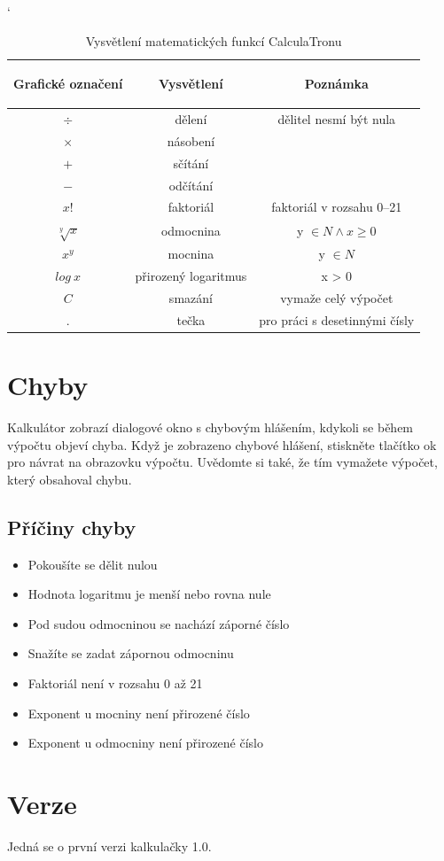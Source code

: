 \documentclass[11pt,a4paper]{article}
\begin{document}
\begin{table}[h]
\begin{center}

\catcode` %
\begin{tabular}{|c|c|c|} \hline
\label{tab1}
    
     \textbf{Grafické označení}  & \textbf{Vysvětlení} & \textbf{Poznámka}\\ \hline
    $ \div$ & dělení & dělitel nesmí být nula \\
    $\times$ & násobení & \\
    $+$ & sčítání & \\
    $-$ & odčítání & \\
    $x!$ & faktoriál & faktoriál v rozsahu 0--21\\
    $\sqrt[y]{x}$& odmocnina & y $\in N \wedge x \geq 0$\\
    $x^y$& mocnina & y $\in N $\\
    $log~x$& přirozený logaritmus & x > 0\\
    $C$& smazání & vymaže celý výpočet\\
    $.$ & tečka & pro práci s desetinnými čísly\\ \hline
   
\end{tabular}

\caption{ Vysvětlení matematických funkcí CalculaTronu}

\end{center}
\end{table}


\section{Chyby}
Kalkulátor zobrazí dialogové okno s chybovým hlášením, kdykoli se během výpočtu objeví chyba. Když je zobrazeno chybové hlášení, stiskněte tlačítko ok pro návrat na obrazovku výpočtu. Uvědomte si také, že tím vymažete výpočet, který obsahoval chybu.

\subsection{Příčiny chyby}
\begin{itemize}

\item Pokoušíte se dělit nulou
\item Hodnota logaritmu je menší nebo rovna nule
\item Pod sudou odmocninou se nachází záporné číslo
\item Snažíte se zadat zápornou odmocninu
\item Faktoriál není v rozsahu 0 až 21
\item Exponent u mocniny není přirozené číslo
\item Exponent u odmocniny není přirozené číslo
\end{itemize}


\section{Verze}
Jedná se o první verzi kalkulačky 1.0.
\end{document}
